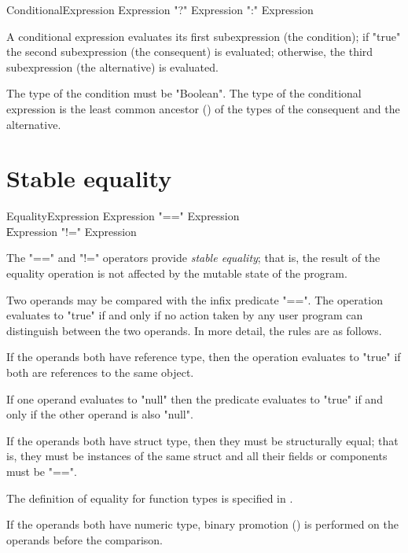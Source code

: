 \begin{grammar}
ConditionalExpression \: Expression
                \xcd"?" Expression
                \xcd":" Expression 
\end{grammar}

A conditional expression evaluates its first subexpression (the
condition); if \xcd"true"
the second subexpression (the consequent) is evaluated; otherwise,
the third subexpression (the alternative) is evaluated.

The type of the condition must be \xcd"Boolean".
The type of the conditional expression is the least common
ancestor () of the types of the consequent and the alternative.

\section{Stable equality}
\label{StableEquality}
\index{==}\index{!=}

\begin{grammar}
EqualityExpression \: Expression \xcd"==" Expression \\
\| Expression \xcd"!=" Expression \\
\end{grammar}

The \xcd"==" and \xcd"!=" operators provide \emph{stable
equality}; that is, the result of the equality operation is not affected
by the mutable state of the program.

Two operands may be compared with the infix predicate \xcd"==".
The operation
evaluates to \xcd"true" if and only if no action taken by any
user program can distinguish between the two operands.  In more detail,
the rules are as follows.

If the operands both have reference type, then the operation evaluates
to \xcd"true" if both are references to the same object.

If one operand evaluates to \xcd"null" then the predicate
evaluates to \xcd"true" if and only if the
other operand is also \xcd"null".

If the operands both have struct type, then they must be structurally equal;
that is, they must be instances of the same struct
and all their fields or components must be \xcd"==". 

The definition of equality for function types is specified in .

If the operands both have numeric type, binary promotion
() is performed on the operands before the
comparison.

